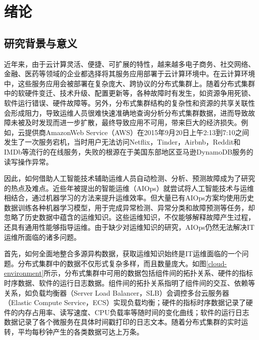 \chapter{绪论}
\section{研究背景与意义}
近年来，由于云计算灵活、便捷、可扩展的特性，越来越多电子商务、社交网络、金融、医药等领域的企业都选择将其服务应用部署于云计算环境中。在云计算环境中，这些服务应用会被部署在复杂庞大、跨协议的分布式集群上。随着分布式集群中的软硬件变迁、技术升级、配置更新等，各种故障时有发生，如资源争用死锁、软件运行错误、硬件故障等。另外，分布式集群结构的复杂性和资源的共享关联性会形成阻力，导致运维人员很难快速准确地查询分析分布式集群数据，进而导致故障未被及时发现而进一步扩散，最终导致应用不可用，带来巨大的经济损失。例如，云提供商AmazonWeb Service（AWS）在2015年9月20日上午2:13到7:10之间发生了一次服务宕机，当时用户无法访问Netflix，Tinder，Airbnb，Reddit和IMDb等流行的在线服务，失败的根源在于美国东部地区亚马逊DynamoDB服务的读写操作异常。

因此，如何借助人工智能技术辅助运维人员自动检测、分析、预测故障成为了研究的热点及难点。近些年被提出的智能运维（AIOps）就尝试将人工智能技术与运维相结合，通过机器学习的方法来提升运维效率。但大量已有AIOps方案均使用历史数据训练各种机器学习模型，用于完成异常检测、异常分类和故障预测等任务，却忽略了历史数据中蕴含的运维知识。这些运维知识，不仅能够解释故障产生过程，还具有通用性能够指导运维。由于缺少对运维知识的研究，AIOps仍然无法解决IT运维所面临的诸多问题。


首先，如何全面地整合多源异构数据，获取运维知识始终是IT运维面临的一个问题。分布式集群中的数据不仅形式复杂多样，而且数量庞大。如图\ref{cloud-environment}所示，分布式集群中可用的数据包括组件间的拓扑关系、硬件的指标时序数据、软件的运行日志数据。组件间的拓扑关系指明了组件间的交互、依赖等关系，如负载均衡器（Server Load Balancer，SLB）会调控多台云服务器（Elastic Compute Service，ECS）实现负载均衡；硬件的指标时序数据记录了硬件的内存占用率、读写速度、CPU负载率等随时间的变化曲线；软件的运行日志数据记录了各个微服务在具体时间戳打印的日志文本。随着分布式集群的实时运转，平均每秒钟产生的各类数据可达上万条。

